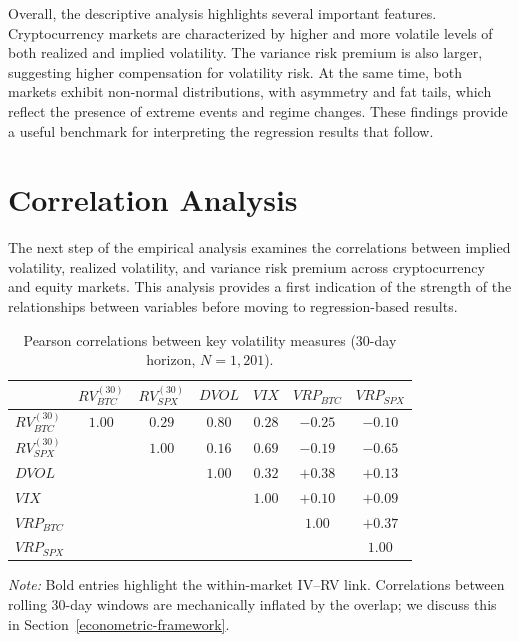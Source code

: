 \documentclass[11pt,a4paper,openany]{report}
\begin{document}
Overall, the descriptive analysis highlights several important features.
Cryptocurrency markets are characterized by higher and more volatile
levels of both realized and implied volatility. The variance risk
premium is also larger, suggesting higher compensation for volatility
risk. At the same time, both markets exhibit non-normal distributions,
with asymmetry and fat tails, which reflect the presence of extreme
events and regime changes. These findings provide a useful benchmark for
interpreting the regression results that follow.

\section{Correlation Analysis}\label{correlation-analysis}

The next step of the empirical analysis examines the correlations
between implied volatility, realized volatility, and variance risk
premium across cryptocurrency and equity markets. This analysis provides
a first indication of the strength of the relationships between
variables before moving to regression-based results.


\begin{table}[H]
\centering
\caption{Pearson correlations between key volatility measures (30-day horizon, $N=1{,}201$).}
\label{tab:corr}
\small
\begin{tabular}{lcccccc}
\toprule
 & $RV^{(30)}_{BTC}$ & $RV^{(30)}_{SPX}$ & $DVOL$ & $VIX$ & $VRP_{BTC}$ & $VRP_{SPX}$ \\
\midrule
$RV^{(30)}_{BTC}$ & $1.00$ & $0.29$ & $\mathbf{0.80}$ & $0.28$ & $-0.25$ & $-0.10$ \\
$RV^{(30)}_{SPX}$ &        & $1.00$ & $0.16$ & $\mathbf{0.69}$ & $-0.19$ & $-0.65$ \\
$DVOL$            &        &        & $1.00$ & $0.32$ & $+0.38$ & $+0.13$ \\
$VIX$             &        &        &        & $1.00$ & $+0.10$ & $+0.09$ \\
$VRP_{BTC}$       &        &        &        &        & $1.00$ & $+0.37$ \\
$VRP_{SPX}$       &        &        &        &        &        & $1.00$ \\
\bottomrule
\end{tabular}
\begin{flushleft}\small
\textit{Note:} Bold entries highlight the within-market IV--RV link. Correlations between rolling 30-day windows are mechanically inflated by the overlap; we discuss this in Section~\ref{econometric-framework}.
\end{flushleft}
\end{table}
\end{document}
